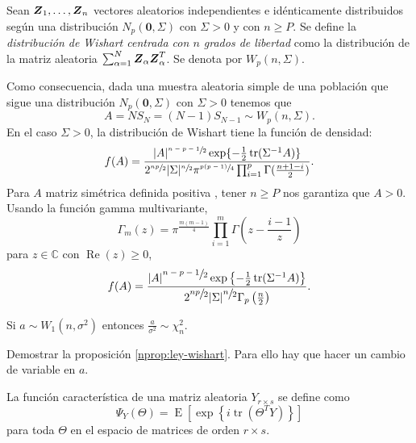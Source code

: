 \begin{ndef}
  Sean \(\boldsymbol{Z}_1, \dots, \boldsymbol{Z}_n\) vectores aleatorios independientes e idénticamente distribuidos según una distribución \(N_p(\boldsymbol 0, \Sigma)\) con \(\Sigma > 0\) y con \(n \geq P\).
  Se define la \textit{distribución de Wishart centrada con \(n\) grados de libertad} como la distribución de la matriz aleatoria \(\sum_{\alpha = 1}^N \boldsymbol{Z}_{\alpha}\boldsymbol{Z}_{\alpha}^T\).
  Se denota por \(W_p(n, \Sigma)\).
\end{ndef}

Como consecuencia, dada una muestra aleatoria simple de una población que sigue una distribución \(N_p(\boldsymbol 0, \Sigma)\) con \(\Sigma > 0\) tenemos que
\[
  A = NS_N = (N-1)S_{N-1} \sim W_p(n, \Sigma).
\]
En el caso \(\Sigma > 0\), la distribución de Wishart tiene la función de densidad:
\[
  f(A) = \frac{
    |A|^{\sfrac{n-p-1}{2}}\exp\{-\frac{1}{2}\operatorname{tr}(\Sigma^{-1}A)\}
  }{
    2^{\sfrac{np}{2}}|\Sigma|^{\sfrac{n}{2}}\pi^{\sfrac{p(p-1)}{4}}\prod_{i=1}^p\Gamma(\frac{n+1-i}{2})
  }.
\]
Para \(A\) matriz simétrica definida positiva , tener \(n \geq P\) nos garantiza que \(A > 0\).
Usando la función gamma multivariante,
\[
 \Gamma_m(z) = \pi^{\textstyle \frac{m(m-1)}{4}}\prod_{i=1}^m \Gamma\left(z - \frac{i-1}{z}\right) 
\]
para \(z \in \mathbb C\) con \(\operatorname{Re}(z) \geq 0\),
\[
  f(A) = \frac{
    |A|^{\textstyle\sfrac{n-p-1}{2}}\exp\left\{-\frac{1}{2}\operatorname{tr}(\Sigma^{-1}A)\right\}
  }{
    2^{\textstyle\sfrac{np}{2}}|\Sigma|^{\textstyle\sfrac{n}{2}}\Gamma_p\left(\frac{n}{2}\right)
  }.
\]

\begin{nprop}
  \label{nprop:ley-wishart}
  Si \(a \sim W_1(n, \sigma^2)\) entonces \(\frac{a}{\sigma^2} \sim \chi^2_n\).
\end{nprop}

\begin{ejer}
  Demostrar  la proposición \ref{nprop:ley-wishart}. Para ello hay que hacer un cambio de variable en \(a\).
\end{ejer}

\begin{nprop}
  La función característica de una matriz aleatoria \(Y_{r \times s}\) se define como
  \[
    \Psi_Y(\Theta) = \operatorname{E}\left[\exp\left\{i \operatorname{tr}\left(\Theta^TY\right)\right\}\right]
  \]
  para toda \(\Theta\) en el espacio de matrices de orden \(r \times s\).
\end{nprop}

